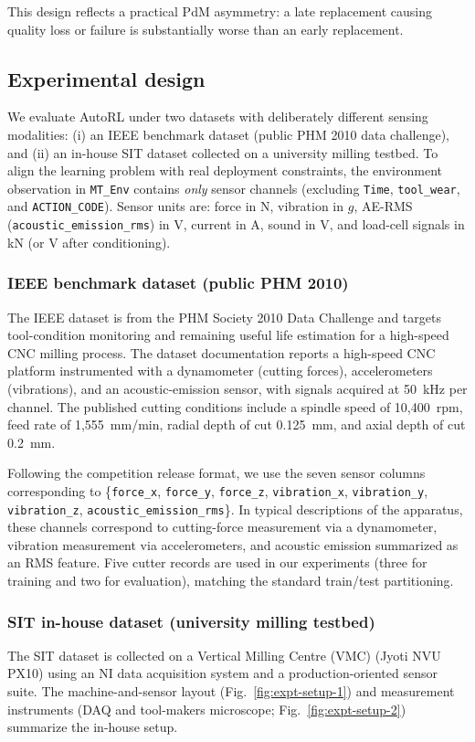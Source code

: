\documentclass[sn-basic]{sn-jnl} %
\begin{document}
This design reflects a practical PdM asymmetry: a late replacement causing quality loss or failure is substantially worse than an early replacement.


\subsection{Experimental design} \label{sec:experiment} 

We evaluate AutoRL under two datasets with deliberately different sensing modalities: (i) an IEEE benchmark dataset (public PHM 2010 data challenge), and (ii) an in-house SIT dataset collected on a university milling testbed. To align the learning problem with real deployment constraints, the environment observation in \texttt{MT\_Env} contains \emph{only} sensor channels (excluding \texttt{Time}, \texttt{tool\_wear}, and \texttt{ACTION\_CODE}). Sensor units are: force in N, vibration in $g$, AE-RMS (\texttt{acoustic\_emission\_rms}) in V, current in A, sound in V, and load-cell signals in kN (or V after conditioning).

\subsubsection{IEEE benchmark dataset (public PHM 2010)}
The IEEE dataset \cite{PHMdata2010} is from the PHM Society 2010 Data Challenge and targets tool-condition monitoring and remaining useful life estimation for a high-speed CNC milling process. The dataset documentation reports a high-speed CNC platform instrumented with a dynamometer (cutting forces), accelerometers (vibrations), and an acoustic-emission sensor, with signals acquired at 50~kHz per channel. The published cutting conditions include a spindle speed of 10{,}400~rpm, feed rate of 1{,}555~mm/min, radial depth of cut 0.125~mm, and axial depth of cut 0.2~mm.

Following the competition release format, we use the seven sensor columns corresponding to \{\texttt{force\_x}, \texttt{force\_y}, \texttt{force\_z}, \texttt{vibration\_x}, \texttt{vibration\_y}, \texttt{vibration\_z}, \texttt{acoustic\_emission\_rms}\}. In typical descriptions of the apparatus, these channels correspond to cutting-force measurement via a dynamometer, vibration measurement via accelerometers, and acoustic emission summarized as an RMS feature. Five cutter records are used in our experiments (three for training and two for evaluation), matching the standard train/test partitioning.

\subsubsection{SIT in-house dataset (university milling testbed)}
The SIT dataset is collected on a Vertical Milling Centre (VMC) (Jyoti NVU PX10) using an NI data acquisition system and a production-oriented sensor suite. The machine-and-sensor layout (Fig.~\ref{fig:expt-setup-1}) and measurement instruments (DAQ and tool-makers microscope; Fig.~\ref{fig:expt-setup-2}) summarize the in-house setup.
\end{document}
